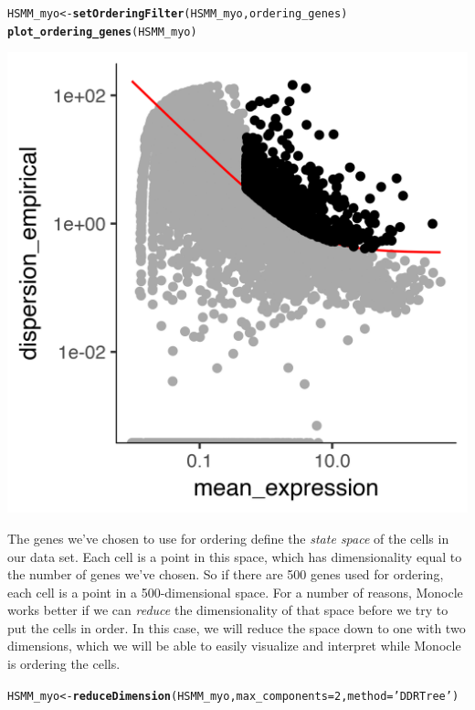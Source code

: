 \documentclass[10pt,oneside]{article}\usepackage[]{graphicx}\usepackage[]{color}
\makeatletter
\def\maxwidth{ %
  \ifdim\Gin@nat@width>\linewidth
    \linewidth
  \else
    \Gin@nat@width
  \fi
}
\newcommand{\hlnum}[1]{\textcolor[rgb]{0.686,0.059,0.569}{#1}}%
\newcommand{\hlstr}[1]{\textcolor[rgb]{0.192,0.494,0.8}{#1}}%
\newcommand{\hlstd}[1]{\textcolor[rgb]{0.345,0.345,0.345}{#1}}%
\newcommand{\hlkwb}[1]{\textcolor[rgb]{0.69,0.353,0.396}{#1}}%
\newcommand{\hlkwc}[1]{\textcolor[rgb]{0.333,0.667,0.333}{#1}}%
\newcommand{\hlkwd}[1]{\textcolor[rgb]{0.737,0.353,0.396}{\textbf{#1}}}%
\newenvironment{kframe}{%
 \def\at@end@of@kframe{}%
 \ifinner\ifhmode%
  \def\at@end@of@kframe{\end{minipage}}%
  \begin{minipage}{\columnwidth}%
 \fi\fi%
 \def\FrameCommand##1{\hskip\@totalleftmargin \hskip-\fboxsep
 \colorbox{shadecolor}{##1}\hskip-\fboxsep
     \hskip-\linewidth \hskip-\@totalleftmargin \hskip\columnwidth}%
 \MakeFramed {\advance\hsize-\width
   \@totalleftmargin\z@ \linewidth\hsize
   \@setminipage}}%
 {\par\unskip\endMakeFramed%
 \at@end@of@kframe}
\newenvironment{knitrout}{}{} %
\makeatother
\begin{document}
\begin{knitrout}
\color{fgcolor}\begin{kframe}
\begin{alltt}
\hlstd{HSMM_myo} \hlkwb{<-} \hlkwd{setOrderingFilter}\hlstd{(HSMM_myo, ordering_genes)}
\hlkwd{plot_ordering_genes}\hlstd{(HSMM_myo)}
\end{alltt}
\end{kframe}

{\centering \includegraphics[width=\maxwidth]{figure/set_ordering_filter-1} 

}



\end{knitrout}
 
The genes we've chosen to use for ordering define the \emph{state space} of the cells in our data set.  Each cell is a point in this space, which has dimensionality equal to the number of genes we've chosen.  So if there are 500 genes used for ordering, each cell is a point in a 500-dimensional space.  For a number of reasons, Monocle works better if we can \emph{reduce} the dimensionality of that space before we try to put the cells in order.  In this case, we will reduce the space down to one with two dimensions, which we will be able to easily visualize and interpret while Monocle is ordering the cells.
\begin{knitrout}
\color{fgcolor}\begin{kframe}
\begin{alltt}
\hlstd{HSMM_myo} \hlkwb{<-} \hlkwd{reduceDimension}\hlstd{(HSMM_myo,} \hlkwc{max_components}\hlstd{=}\hlnum{2}\hlstd{,} \hlkwc{method} \hlstd{=} \hlstr{'DDRTree'}\hlstd{)}
\end{alltt}
\end{kframe}
\end{knitrout}
 
\end{document}
